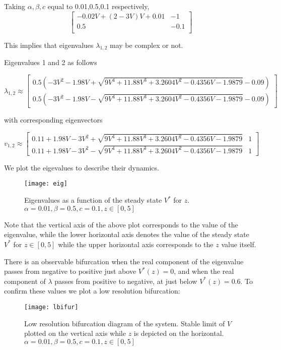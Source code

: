 \documentclass[11pt]{report}
\begin{document}
Taking $\alpha,\beta,c$ equal to 0.01,0.5,0.1 respectively,
$$
\begin{bmatrix}
    −0.02V+(2−3V)V+0.01 & -1 \\
    0.5 & -0.1 \\    
\end{bmatrix}
$$

This implies that eigenvalues $\lambda_{1,2}$ may be complex or not. 

Eigenvalues 1 and 2 as follows

$$ \lambda_{1,2} \approx \begin{bmatrix} 0.5(-3V^2 - 1.98V + \sqrt{ 9V^4 + 11.88 V^3 + 3.2604 V^2 - 0.4356 V - 1.9879 } - 0.09) \\ 0.5(-3V^2 - 1.98V - \sqrt{ 9V^4 + 11.88 V^3 + 3.2604 V^2 - 0.4356 V - 1.9879 } - 0.09) \end{bmatrix} $$

with corresponding eigenvectors

$$ v_{1,2} \approx \begin{bmatrix} 0.11 + 1.98V - 3V^2 + \sqrt{ 9V^4 + 11.88 V^3 + 3.2604 V^2 - 0.4356 V - 1.9879} & 1 \\ 0.11 + 1.98V - 3V^2 - \sqrt{ 9V^4 + 11.88 V^3 + 3.2604 V^2 - 0.4356 V - 1.9879} & 1 \end{bmatrix} $$

We plot the eigevalues to describe their dynamics. 

\begin{figure}[!ht]
  \caption{Eigenvalues as a function of the steady state $V^*$ for $z$.  $\alpha = 0.01, \beta = 0.5,c = 0.1,z \in [0,5]$ }
  \centering
    \texttt{[image: eig]}
\end{figure}

Note that the vertical axis of the above plot corresponds to the value of the eigenvalue, while the lower horizontal axis denotes the value of the steady state $V^*$ for $z \in [0,5]$ while the upper horizontal axis corresponds to the $z$ value itself.

There is an observable bifurcation when the real component of the eigenvalue passes from negative to positive just above $V^*(z) = 0$, and when the real component of $\lambda$ passes from positive to negative, at just below $V^*(z) = 0.6$. To confirm these values we plot a low resolution bifurcation:


\begin{figure}[!ht]
  \caption{Low resolution bifurcation diagram of the system. Stable limit of $V$ plotted on the vertical axis while $z$ is depicted on the horizontal. $\alpha = 0.01, \beta = 0.5,c = 0.1,z \in [0,5]$ }
  \centering
    \texttt{[image: lbifur]}
\end{figure}
\end{document}
